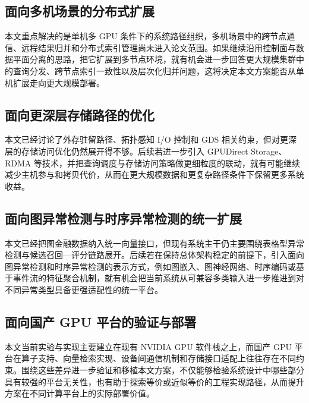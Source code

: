 \subsection{面向多机场景的分布式扩展}

本文重点解决的是单机多 GPU 条件下的系统路径组织，多机场景中的跨节点通信、远程结果归并和分布式索引管理尚未进入论文范围。如果继续沿用控制面与数据平面分离的思路，把它扩展到多节点环境，就有机会进一步回答更大规模集群中的查询分发、跨节点索引一致性以及层次化归并问题，这将决定本文方案能否从单机扩展走向更大规模部署。

\subsection{面向更深层存储路径的优化}

本文已经讨论了外存驻留路径、拓扑感知 I/O 控制和 GDS 相关约束，但对更深层的存储访问优化仍然展开得不够。后续若进一步引入 GPUDirect Storage、RDMA 等技术，并把查询调度与存储访问策略做更细粒度的联动，就有可能继续减少主机参与和拷贝代价，从而在更大规模数据和更复杂路径条件下保留更多系统收益。

\subsection{面向图异常检测与时序异常检测的统一扩展}

本文已经把图金融数据纳入统一向量接口，但现有系统主干仍主要围绕表格型异常检测与候选召回---评分链路展开。后续若在保持总体架构稳定的前提下，引入面向图异常检测和时序异常检测的表示方式，例如图嵌入、图神经网络、时序编码或基于事件流的特征聚合机制，就有机会把当前系统从可兼容多类输入进一步推进到对不同异常类型具备更强适配性的统一平台。

\subsection{面向国产 GPU 平台的验证与部署}

本文当前实验与实现主要建立在现有 NVIDIA GPU 软件栈之上，而国产 GPU 平台在算子支持、向量检索实现、设备间通信机制和存储接口适配上往往存在不同约束。围绕这些差异进一步验证和移植本文方案，不仅能够检验系统设计中哪些部分具有较强的平台无关性，也有助于探索等价或近似等价的工程实现路径，从而提升方案在不同计算平台上的实际部署价值。
